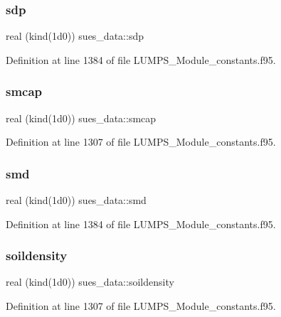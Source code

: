 \subsubsection{\texorpdfstring{sdp}{sdp}}
{\footnotesize\ttfamily real (kind(1d0)) sues\+\_\+data\+::sdp}



Definition at line 1384 of file L\+U\+M\+P\+S\+\_\+\+Module\+\_\+constants.\+f95.

\mbox{\label{namespacesues__data_a08339a22d19b4766db4ad302512459ba}} 
\subsubsection{\texorpdfstring{smcap}{smcap}}
{\footnotesize\ttfamily real (kind(1d0)) sues\+\_\+data\+::smcap}



Definition at line 1307 of file L\+U\+M\+P\+S\+\_\+\+Module\+\_\+constants.\+f95.

\mbox{\label{namespacesues__data_ac73de7c829233718bfd143f4346adf70}} 
\subsubsection{\texorpdfstring{smd}{smd}}
{\footnotesize\ttfamily real (kind(1d0)) sues\+\_\+data\+::smd}



Definition at line 1384 of file L\+U\+M\+P\+S\+\_\+\+Module\+\_\+constants.\+f95.

\mbox{\label{namespacesues__data_ac26ae7a72cca3b9be662578e90231c4a}} 
\subsubsection{\texorpdfstring{soildensity}{soildensity}}
{\footnotesize\ttfamily real (kind(1d0)) sues\+\_\+data\+::soildensity}



Definition at line 1307 of file L\+U\+M\+P\+S\+\_\+\+Module\+\_\+constants.\+f95.


